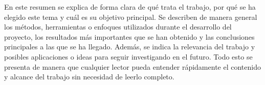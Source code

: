 

En este resumen se explica de forma clara de qué trata el trabajo, por qué se ha elegido este tema y cuál es su objetivo principal. Se describen de manera general los métodos, herramientas o enfoques utilizados durante el desarrollo del proyecto, los resultados más importantes que se han obtenido y las conclusiones principales a las que se ha llegado. Además, se indica la relevancia del trabajo y posibles aplicaciones o ideas para seguir investigando en el futuro. Todo esto se presenta de manera que cualquier lector pueda entender rápidamente el contenido y alcance del trabajo sin necesidad de leerlo completo.

